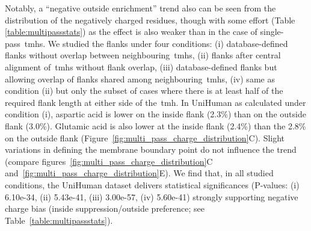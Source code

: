 Notably, a ``negative outside enrichment'' trend also can be seen from the distribution of the negatively charged residues, though with some effort (Table \ref{table:multipassstats}) as the effect is also weaker than in the case of single-pass~\gls{tmh}s.
We studied the flanks under four conditions: (i) database-defined flanks without overlap between neighbouring~\gls{tmh}s, (ii) flanks after central alignment of~\gls{tmh}s without flank overlap, (iii) database-defined flanks but allowing overlap of flanks shared among neighbouring~\gls{tmh}s, (iv) same as condition (ii) but only the subset of cases where there is at least half of the required flank length at either side of the~\gls{tmh}.
In UniHuman as calculated under condition (i), aspartic acid is lower on the inside flank (2.3\%) than on the outside flank (3.0\%).
Glutamic acid is also lower at the inside flank (2.4\%) than the 2.8\% on the outside flank (Figure~\ref{fig:multi_pass_charge_distribution}C).
Slight variations in defining the membrane boundary point do not influence the trend (compare figures~\ref{fig:multi_pass_charge_distribution}C and~\ref{fig:multi_pass_charge_distribution}E).
We find that, in all studied conditions, the UniHuman dataset delivers statistical significances (P\--values: (i) 6.10e-34, (ii) 5.43e-41, (iii) 3.00e-57, (iv) 5.60e-41) strongly supporting negative charge bias (inside suppression/outside preference; see Table~\ref{table:multipassstats}).



